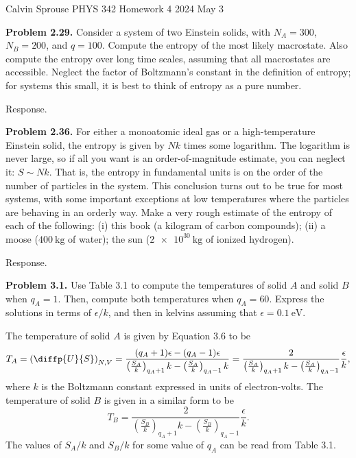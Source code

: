 \documentclass[a4paper, 12pt]{config/homework}
\begin{document}
\noindent
\hfill Calvin Sprouse \hfill PHYS 342 Homework 4 \hfill 2024 May 3 \hfill

\bigskip\noindent
\textbf{Problem 2.29.} Consider a system of two Einstein solids, with \(N_A=300\), \(N_B=200\), and \(q=100\). Compute the entropy of the most likely macrostate. Also compute the entropy over long time scales, assuming that all macrostates are accessible. Neglect the factor of Boltzmann's constant in the definition of entropy; for systems this small, it is best to think of entropy as a pure number.

\noindent
Response.

\pagebreak
\noindent
\textbf{Problem 2.36.} For either a monoatomic ideal gas or a high-temperature Einstein solid, the entropy is given by \(Nk\) times some logarithm. The logarithm is never large, so if all you want is an order-of-magnitude estimate, you can neglect it: \(S \sim Nk\). That is, the entropy in fundamental units is on the order of the number of particles in the system. This conclusion turns out to be true for most systems, with some important exceptions at low temperatures where the particles are behaving in an orderly way. Make a very rough estimate of the entropy of each of the following: (i) this book (a kilogram of carbon compounds); (ii) a moose (\(\qty{400}{\kg}\) of water); the sun (\(\qty{2e30}{\kg}\) of ionized hydrogen).

\noindent
Response.

\pagebreak
\noindent
\textbf{Problem 3.1.} Use Table 3.1 to compute the temperatures of solid \(A\) and solid \(B\) when \(q_A=1\). Then, compute both temperatures when \(q_A=60\). Express the solutions in terms of \(\epsilon/k\), and then in kelvins assuming that \(\epsilon=\qty{0.1}{\eV}\).

\noindent
The temperature of solid \(A\) is given by Equation 3.6 to be
\[T_A = \left(\diffp{U}{S}\right)_{N,V}
= \frac{(q_A + 1)\epsilon - (q_A - 1)\epsilon}{\left(\frac{S_A}{k}\right)_{q_A+1}k - \left(\frac{S_A}{k}\right)_{q_A-1}k}
= \frac{2}{\left(\frac{S_A}{k}\right)_{q_A+1}k - \left(\frac{S_A}{k}\right)_{q_A-1}}\frac{\epsilon}{k},\]
where \(k\) is the Boltzmann constant expressed in units of electron-volts. The temperature of solid \(B\) is given in a similar form to be
\[T_B =\frac{2}{\left(\frac{S_B}{k}\right)_{q_A+1}k - \left(\frac{S_B}{k}\right)_{q_A-1}}\frac{\epsilon}{k}.\]
The values of \(S_A/k\) and \(S_B/k\) for some value of \(q_A\) can be read from Table 3.1.
\end{document}
